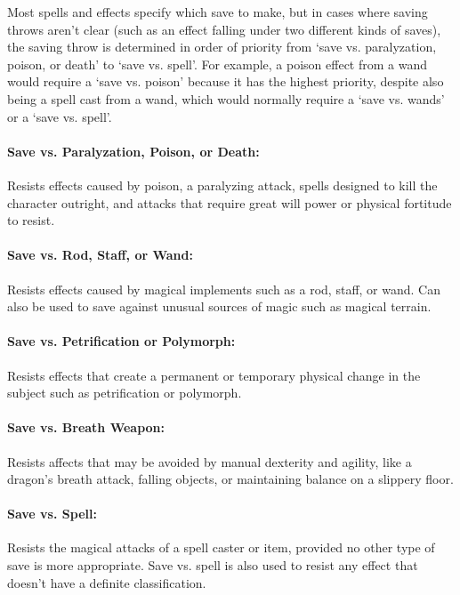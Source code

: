 \begin{multicols}{2}
Most spells and effects specify which save to make, but in cases where saving throws aren't clear (such as an effect falling under two different kinds of saves), the saving throw is determined in order of priority from `save vs. paralyzation, poison, or death' to `save vs. spell'.  For example, a poison effect from a wand would require a `save vs. poison' because it has the highest priority, despite also being a spell cast from a wand, which would normally require a `save vs. wands' or a `save vs. spell'.

\paragraph{Save vs. Paralyzation, Poison, or Death:} Resists effects caused by poison, a paralyzing attack, spells designed to kill the character outright, and attacks that require great will power or physical fortitude to resist.  

\paragraph{Save vs. Rod, Staff, or Wand:} Resists effects caused by magical implements such as a rod, staff, or wand.  Can also be used to save against unusual sources of magic such as magical terrain.

\paragraph{Save vs. Petrification or Polymorph:} Resists effects that create a permanent or temporary physical change in the subject such as petrification or polymorph.

\paragraph{Save vs. Breath Weapon:} Resists affects that may be avoided by manual dexterity and agility, like a dragon's breath attack, falling objects, or maintaining balance on a slippery floor.

\paragraph{Save vs. Spell:} Resists the magical attacks of a spell caster or item, provided no other type of save is more appropriate.  Save vs. spell is also used to resist any effect that doesn't have a definite classification.


\end{multicols}
